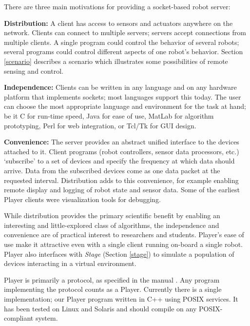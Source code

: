 There are three main motivations for providing a socket-based robot
server:

  
{\bf Distribution:} A client has access to sensors and actuators
  anywhere on the network. Clients can connect to multiple servers;
  servers accept connections from multiple clients. A single program
  could control the behavior of several robots; several programs could
  control different aspects of one robot's behavior.  Section
  \ref{scenario} describes a scenario which illustrates some
  possibilities of remote sensing and control.
  
{\bf Independence:} Clients can be written in any language and
  on any hardware platform that implements sockets; most languages support
  this today. The user can choose the most appropriate language and
  environment for the task at hand; be it C for run-time speed, Java
  for ease of use, MatLab for algorithm prototyping, Perl for web
  integration, or Tcl/Tk for GUI design.

{\bf Convenience:} The server provides an abstract unified
  interface to the devices attached to it. Client programs (robot
  controllers, sensor data processors, etc.) `subscribe' to a set of
  devices and specify the frequency at which data should arrive.  Data
  from the subscribed devices come as one data packet at the
  requested interval. Distribution adds to this convenience, for
  example enabling remote display and logging of robot state and
  sensor data. Some of the earliest Player clients were
  visualization tools for debugging.


While distribution provides the primary scientific benefit by enabling
an interesting and little-explored class of algorithms, the
independence and convenience are of practical interest to researchers
and students.  Player's ease of use make it attractive even with a
single client running on-board a single robot. Player also interfaces
with {\it Stage} (Section \ref{stage}) to simulate a population of
devices interacting in a virtual environment.

Player is primarily a protocol, as specified in the manual
\cite{GerkeyStoyVaughan00}. 
Any program implementing the protocol counts as a Player. Currently there
is a single implementation; our Player program written in C++ using
POSIX services. It has been tested on Linux and Solaris and should
compile on any POSIX-compliant system. 


